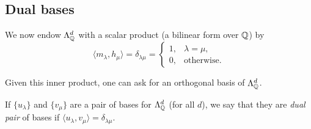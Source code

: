\subsection{Dual bases}

	We now endow $\Lambda_{\mathbb{Q}}^d$ with a scalar product (a bilinear form over $\mathbb{Q}$) by
	\[ \langle m_\lambda , h_\mu \rangle = \delta_{\lambda\mu} = \begin{cases} 1, & \lambda = \mu, \\ 0, & \text{otherwise.} \end{cases} \]

	Given this inner product, one can ask for an orthogonal basis of $\Lambda_{\mathbb{Q}}^d$.

	\begin{fdef}
		If $\{u_\lambda\}$ and $\{v_\mu\}$ are a pair of bases for $\Lambda_{\mathbb{Q}}^d$ (for all $d$), we say that they are \emph{dual pair} of bases if $\langle u_\lambda , v_\mu \rangle = \delta_{\lambda\mu}$.
	\end{fdef}

